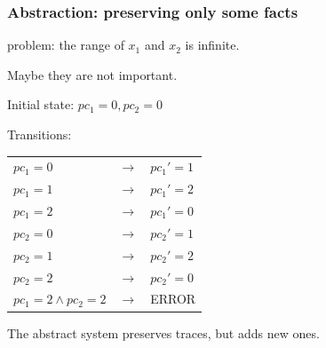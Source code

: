 \documentclass{beamer}
\begin{document}
\begin{frame}
  \frametitle{Abstraction: preserving only some facts}
  problem: the range of $x_1$ and $x_2$ is infinite.

  \vspace{5pt}

  Maybe they are not important.
  
  \vfill

  Initial state: $pc_1 = 0, pc_2 = 0$
 
  \vspace{5pt}

  Transitions:

  \begin{tabular}{lcl}
    $pc_1=0$ & $\rightarrow$ & $pc_1'=1$ \\
    $pc_1=1$ & $\rightarrow$ & $pc_1'=2$ \\
    $pc_1=2$ & $\rightarrow$ & $pc_1'=0$ \\
    $pc_2=0$ & $\rightarrow$ & $pc_2'=1$ \\
    $pc_2=1$ & $\rightarrow$ & $pc_2'=2$ \\
    $pc_2=2$ & $\rightarrow$ & $pc_2'=0$ \\
    $pc_1=2 \land pc_2=2$ & $\rightarrow$ & ERROR
  \end{tabular}
  
  \vspace{10pt}

  The abstract system preserves traces, but adds new ones.

\end{frame}
\end{document}
